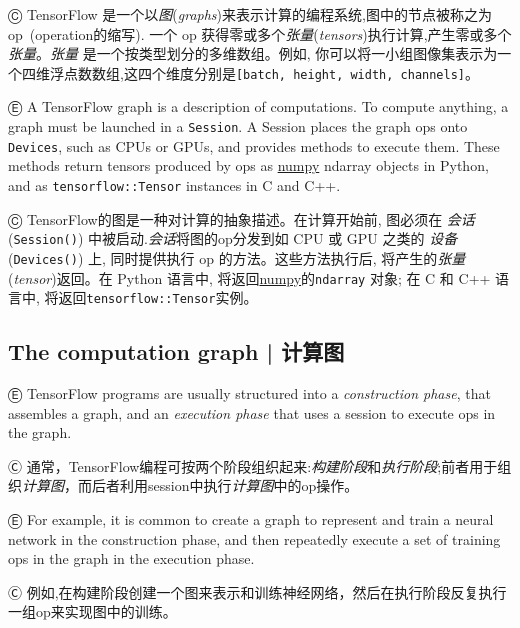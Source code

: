 Ⓒ TensorFlow 是一个以\emph{图}(\emph{graphs})来表示计算的编程系统,图中的节点被称之为 op~(operation的缩写). 一个 op 获得零或多个\emph{张量}(\emph{tensors})执行计算,产生零或多个\emph{张量}。\emph{张量} 是一个按类型划分的多维数组。例如, 你可以将一小组图像集表示为一个四维浮点数数组,这四个维度分别是\lstinline{[batch, height, width, channels]}。

Ⓔ \textcolor{etc}{A TensorFlow graph is a description of computations. To compute anything, a graph must be launched in a \lstinline{Session}. A Session places the graph ops onto \lstinline{Devices}, such as CPUs or GPUs, and provides methods to execute them. These methods return tensors produced by ops as \href{http://www.numpy.org/}{numpy} ndarray objects in Python, and as \lstinline{tensorflow::Tensor} instances in C and C++.}

Ⓒ TensorFlow的图是一种对计算的抽象描述。在计算开始前, 图必须在 \emph{会话}(\lstinline{Session()}) 中被启动.\emph{会话}将图的op分发到如 CPU 或 GPU 之类的 \emph{设备}(\lstinline{Devices()}) 上, 同时提供执行 op 的方法。这些方法执行后, 将产生的\emph{张量}(\emph{tensor})返回。在 Python 语言中, 将返回\href{http://www.numpy.org}{numpy}的\lstinline{ndarray} 对象; 在 C 和 C++ 语言中, 将返回\lstinline{tensorflow::Tensor}实例。


%
\subsection {The computation graph  |  计算图} \label{computation_graph}

Ⓔ \textcolor{etc}{TensorFlow programs are usually structured into a \emph{construction phase}, that assembles a graph, and an \emph{execution phase} that uses a session to execute ops in the graph.}

Ⓒ 通常，TensorFlow编程可按两个阶段组织起来:\emph{构建阶段}和\emph{执行阶段};前者用于组织\emph{计算图}，而后者利用session中执行\emph{计算图}中的op操作。

Ⓔ \textcolor{etc}{For example, it is common to create a graph to represent and train a neural network in the construction phase, and then repeatedly execute a set of training ops in the graph in the execution phase.}

Ⓒ 例如,在构建阶段创建一个图来表示和训练神经网络，然后在执行阶段反复执行一组op来实现图中的训练。

